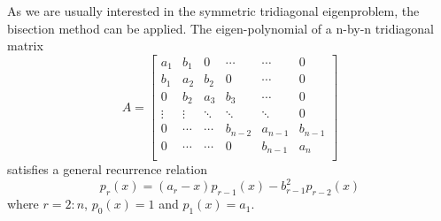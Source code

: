 As we are usually interested in the symmetric tridiagonal eigenproblem, the bisection method can be applied. 
The eigen-polynomial of a n-by-n tridiagonal matrix
\begin{equation}
A=\left[\begin{array}{cccccc}   
    a_1 &    b_1    & 0   & \cdots  & \cdots  & 0\\  
    b_1 &    a_2    & b_2  & 0       & \cdots  & 0\\
    0 &    b_2    & a_3  & b_3       & \cdots  & 0\\ 
    \vdots &    \vdots    & \ddots  & \ddots  & \ddots  & 0\\ 
    0 &    \cdots    & \cdots  & b_{n-2}       & a_{n-1}  & b_{n-1}\\ 
    0 &    \cdots    & \cdots  & 0       & b_{n-1}  & a_{n}\\ 
\end{array}\right]
\end{equation} 
satisfies a general recurrence relation
\begin{equation}
	p_r(x)=(a_r-x)p_{r-1}(x)-b_{r-1}^2p_{r-2}(x)
\end{equation}
where $r=2:n$, $p_0(x)=1$ and $p_1(x)=a_1$.

